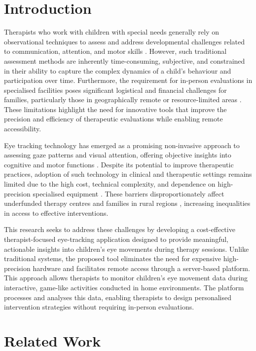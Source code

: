 \documentclass[10pt,a4paper,twoside]{article}
\begin{document}
\section{Introduction}
\label{Intro}

Therapists who work with children with special needs generally rely on observational techniques to assess and address developmental challenges related to communication, attention, and motor skills \cite{Powers2025}. However, such traditional assessment methods are inherently time-consuming, subjective, and constrained in their ability to capture the complex dynamics of a child’s behaviour and participation over time. Furthermore, the requirement for in-person evaluations in specialised facilities poses significant logistical and financial challenges for families, particularly those in geographically remote or resource-limited areas \cite{ramezani2025bench}. These limitations highlight the need for innovative tools that improve the precision and efficiency of therapeutic evaluations while enabling remote accessibility.

Eye tracking technology has emerged as a promising non-invasive approach to assessing gaze patterns and visual attention, offering objective insights into cognitive and motor functions \cite{wolf2021contribution}. Despite its potential to improve therapeutic practices, adoption of such technology in clinical and therapeutic settings remains limited due to the high cost, technical complexity, and dependence on high-precision specialised equipment \cite{CyntiaLimaFonsecaRodrigues2024}. These barriers disproportionately affect underfunded therapy centres and families in rural regions \cite{Hunt2025}, increasing inequalities in access to effective interventions.

This research seeks to address these challenges by developing a cost-effective therapist-focused eye-tracking application designed to provide meaningful, actionable insights into children’s eye movements during therapy sessions. Unlike traditional systems, the proposed tool eliminates the need for expensive high-precision hardware and facilitates remote access through a server-based platform. This approach allows therapists to monitor children’s eye movement data during interactive, game-like activities conducted in home environments. The platform processes and analyses this data, enabling therapists to design personalised intervention strategies without requiring in-person evaluations.

\section{Related Work}
\label{RW}
\end{document}
